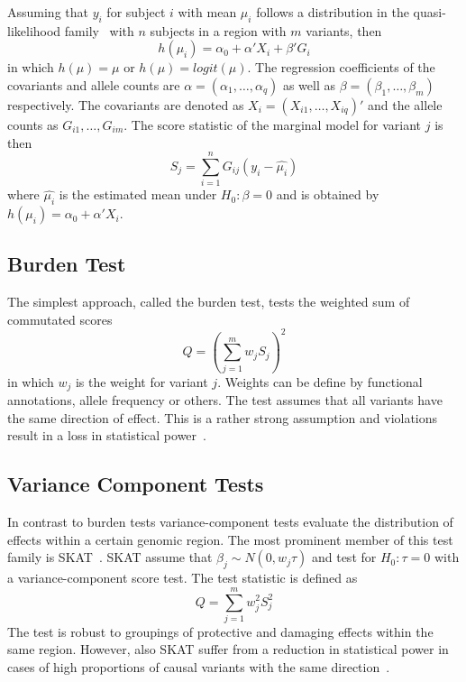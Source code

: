 \documentclass[../header.tex]{subfiles}
\begin{document}
Assuming that $y_i$ for subject $i$ with mean $\mu_i$ follows a distribution in the quasi-likelihood family~\cite{Lee2014} with $n$ subjects in a region with $m$ variants, then
\begin{equation}
  h(\mu_i) = \alpha_0 + \alpha'X_i +\beta'G_i
\end{equation}
in which $h(\mu) = \mu$ or $h(\mu) = logit(\mu)$.
The regression coefficients of the covariants and allele counts are $\alpha = (\alpha_1, \ldots, \alpha_q)$ as well as $\beta = (\beta_1, \ldots, \beta_m)$ respectively.
The covariants are denoted as $X_i = (X_{i1}, \ldots, X_{iq})'$ and the allele counts as $G_{i1}, \ldots, G_{im}$.
The score statistic of the marginal model for variant $j$ is then
\begin{equation}
  S_j = \sum^n_{i=1} G_{ij}(y_i-\hat{\mu_i})
\end{equation}
where $\hat{\mu_i}$ is the estimated mean under $H_0: \beta = 0 $ and is obtained by $h(\mu_i) = \alpha_0 + \alpha'X_i$.

\subsection{Burden Test}
\label{sub:burden_test}
The simplest approach, called the burden test, tests the weighted sum of commutated scores
\begin{equation}\label{eq:burden}
  Q = {(\sum^{m}_{j=1} w_{j} S_{j})}^2
\end{equation}
in which $w_j$ is the weight for variant $j$.
Weights can be define by functional annotations, allele frequency or others.
The test assumes that all variants  have the same direction of effect.
This is a rather strong assumption and violations result in a loss in statistical power~\cite{Derkach2013a}.

\subsection{Variance Component Tests}
\label{sub:variance_component_tests}
In contrast to burden tests variance-component tests evaluate the distribution of effects within a certain genomic region.
The most prominent member of this test family is SKAT~\cite{Wu2011}.
SKAT assume that $\beta_j\sim N(0,w_j\tau)$ and test for $H_0: \tau = 0$ with a variance-component score test.
The test statistic is defined as
\begin{equation}\label{eq:skat}
  Q = \sum^{m}_{j=1} w_{j}^2 S_{j}^2
\end{equation}
The test is robust to groupings of protective and damaging effects within the same region.
However, also SKAT suffer from a reduction in statistical power in cases of high proportions of causal variants with the same direction~\cite{Derkach2013a}.
\end{document}
